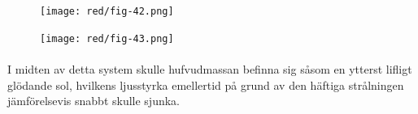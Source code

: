 \documentclass[a4paper, 12pt, oneside, swedish]{article}
\begin{document}
\begin{figure}[H]
\centering
\texttt{[image: red/fig-42.png]}
\caption{}
\end{figure}

\begin{figure}[H]
\centering
\texttt{[image: red/fig-43.png]}
\caption{}
\end{figure}
\paragraph{}
I midten av detta system skulle hufvudmassan befinna sig såsom en ytterst lifligt glödande sol, hvilkens ljusstyrka emellertid på grund av den häftiga strålningen jämförelsevis snabbt skulle sjunka.
\end{document}
